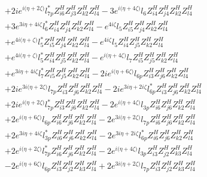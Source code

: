 \begin{align}
 &+2 i e^{i \Big(\eta +2 \zeta \Big)} l_{7p}^* Z_{{i 6}}^{H} Z_{{j 3}}^{H} Z_{{k 2}}^{H} Z_{{l 4}}^{H} -3 e^{i \Big(\eta +4 \zeta \Big)} l_6 Z_{{i 4}}^{H} Z_{{j 4}}^{H} Z_{{k 2}}^{H} Z_{{l 4}}^{H} \nonumber \\ 
 &+3 e^{3 i \eta +4 i \zeta } l_6^* Z_{{i 4}}^{H} Z_{{j 4}}^{H} Z_{{k 2}}^{H} Z_{{l 4}}^{H} - e^{4 i \zeta } l_5 Z_{{i 5}}^{H} Z_{{j 4}}^{H} Z_{{k 2}}^{H} Z_{{l 4}}^{H} \nonumber \\ 
 &+e^{4 i \Big(\eta +\zeta \Big)} l_5^* Z_{{i 5}}^{H} Z_{{j 4}}^{H} Z_{{k 2}}^{H} Z_{{l 4}}^{H} - e^{4 i \zeta } l_5 Z_{{i 4}}^{H} Z_{{j 5}}^{H} Z_{{k 2}}^{H} Z_{{l 4}}^{H} \nonumber \\ 
 &+e^{4 i \Big(\eta +\zeta \Big)} l_5^* Z_{{i 4}}^{H} Z_{{j 5}}^{H} Z_{{k 2}}^{H} Z_{{l 4}}^{H} - e^{i \Big(\eta +4 \zeta \Big)} l_7 Z_{{i 5}}^{H} Z_{{j 5}}^{H} Z_{{k 2}}^{H} Z_{{l 4}}^{H} \nonumber \\ 
 &+e^{3 i \eta +4 i \zeta } l_7^* Z_{{i 5}}^{H} Z_{{j 5}}^{H} Z_{{k 2}}^{H} Z_{{l 4}}^{H} -2 i e^{i \Big(\eta +6 \zeta \Big)} l_{6p} Z_{{i 3}}^{H} Z_{{j 6}}^{H} Z_{{k 2}}^{H} Z_{{l 4}}^{H} \nonumber \\ 
 &+2 i e^{3 i \Big(\eta +2 \zeta \Big)} l_{7p} Z_{{i 3}}^{H} Z_{{j 6}}^{H} Z_{{k 2}}^{H} Z_{{l 4}}^{H} -2 i e^{3 i \eta +2 i \zeta } l_{6p}^* Z_{{i 3}}^{H} Z_{{j 6}}^{H} Z_{{k 2}}^{H} Z_{{l 4}}^{H} \nonumber \\ 
 &+2 i e^{i \Big(\eta +2 \zeta \Big)} l_{7p}^* Z_{{i 3}}^{H} Z_{{j 6}}^{H} Z_{{k 2}}^{H} Z_{{l 4}}^{H} -2 e^{i \Big(\eta +4 \zeta \Big)} l_{3p} Z_{{i 6}}^{H} Z_{{j 6}}^{H} Z_{{k 2}}^{H} Z_{{l 4}}^{H} \nonumber \\ 
 &+2 e^{i \Big(\eta +6 \zeta \Big)} l_{6p} Z_{{i 6}}^{H} Z_{{j 6}}^{H} Z_{{k 2}}^{H} Z_{{l 4}}^{H} -2 e^{3 i \Big(\eta +2 \zeta \Big)} l_{7p} Z_{{i 6}}^{H} Z_{{j 6}}^{H} Z_{{k 2}}^{H} Z_{{l 4}}^{H} \nonumber \\ 
 &+2 e^{3 i \eta +4 i \zeta } l_{3p}^* Z_{{i 6}}^{H} Z_{{j 6}}^{H} Z_{{k 2}}^{H} Z_{{l 4}}^{H} -2 e^{3 i \eta +2 i \zeta } l_{6p}^* Z_{{i 6}}^{H} Z_{{j 6}}^{H} Z_{{k 2}}^{H} Z_{{l 4}}^{H} \nonumber \\ 
 &+2 e^{i \Big(\eta +2 \zeta \Big)} l_{7p}^* Z_{{i 6}}^{H} Z_{{j 6}}^{H} Z_{{k 2}}^{H} Z_{{l 4}}^{H} -2 e^{i \Big(\eta +4 \zeta \Big)} l_{3p} Z_{{i 3}}^{H} Z_{{j 2}}^{H} Z_{{k 3}}^{H} Z_{{l 4}}^{H} \nonumber \\ 
 &-2 e^{i \Big(\eta +6 \zeta \Big)} l_{6p} Z_{{i 3}}^{H} Z_{{j 2}}^{H} Z_{{k 3}}^{H} Z_{{l 4}}^{H} +2 e^{3 i \Big(\eta +2 \zeta \Big)} l_{7p} Z_{{i 3}}^{H} Z_{{j 2}}^{H} Z_{{k 3}}^{H} Z_{{l 4}}^{H} \nonumber \\ 

\end{align}
